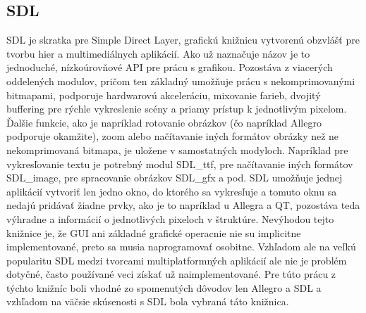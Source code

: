 \subsection{SDL}
SDL je skratka pre Simple Direct Layer, grafickú knižnicu vytvorenú obzvlášť pre tvorbu hier a multimediálnych aplikácií. Ako už naznačuje názov je to jednoduché, nízkoúrovňové API pre prácu s grafikou. Pozostáva z viacerých oddelených modulov, pričom ten základný umožňuje prácu s nekomprimovanými bitmapami, podporuje hardwarovú akceleráciu, mixovanie farieb, dvojitý buffering pre rýchle vykreslenie scény a priamy prístup k jednotlivým pixelom. Ďalšie funkcie, ako je napríklad rotovanie obrázkov (čo napríklad Allegro podporuje okamžite), zoom alebo načítavanie iných formátov obrázky než ne nekomprimovaná bitmapa, je uložene v samostatných modyloch. Napríklad pre vykresľovanie textu je potrebný modul SDL\_ttf, pre načítavanie iných formátov SDL\_image, pre spracovanie obrázkov SDL\_gfx a pod. \newline
\indent
SDL umožňuje jednej aplikácií vytvoriť len jedno okno, do ktorého sa vykresľuje a tomuto oknu sa nedajú pridávať žiadne prvky, ako je to napríklad u Allegra a QT, pozostáva teda výhradne a informácií o jednotlivých pixeloch v štruktúre.
\newline
\indent
Nevýhodou tejto knižnice je, že GUI ani základné grafické operacnie nie su implicitne implementované, preto sa musia naprogramovať osobitne. Vzhľadom ale na veľkú popularitu SDL medzi tvorcami multiplatformných aplikácií ale nie je problém dotyčné, často používané veci získať už naimplementované.
\newline
\newline
\newline
\indent
Pre túto prácu z týchto knižníc boli vhodné zo spomenutých dôvodov len Allegro a SDL a vzhľadom na väčsie skúsenosti s SDL bola vybraná táto knižnica.
\newpage
